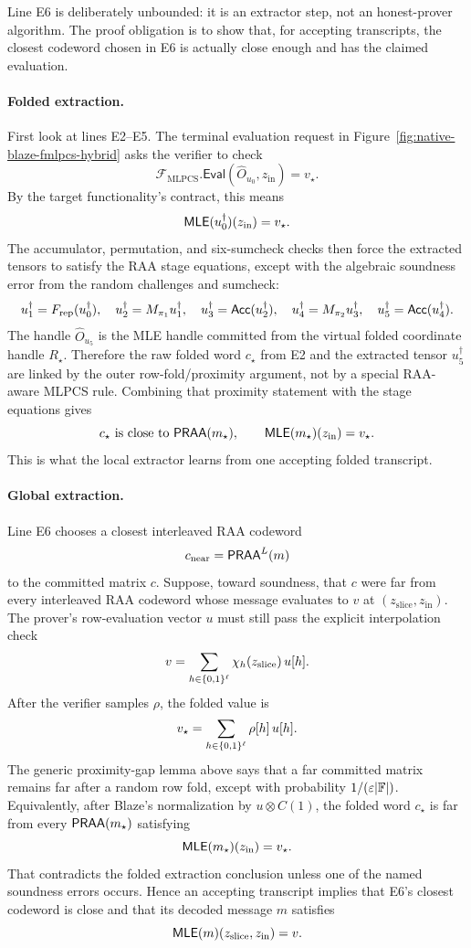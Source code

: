 Line E6 is deliberately unbounded: it is an extractor step, not an honest-prover
algorithm.  The proof obligation is to show that, for accepting transcripts,
the closest codeword chosen in E6 is actually close enough and has the claimed
evaluation.

\paragraph{Folded extraction.}
First look at lines E2--E5.  The terminal evaluation request in
Figure~\ref{fig:native-blaze-fmlpcs-hybrid} asks the verifier to check
\[
  \mathcal F_{\mathrm{MLPCS}}.\mathsf{Eval}
  (\widehat O_{u_0},z_{\mathrm{in}})
  =
  v_\star.
\]
By the target functionality's contract, this means
\[
  \mathsf{MLE}(u_0^\dagger)(z_{\mathrm{in}})=v_\star.
\]
The accumulator, permutation, and six-sumcheck checks then force the extracted
tensors to satisfy the RAA stage equations, except with the algebraic
soundness error from the random challenges and sumcheck:
\[
  u_1^\dagger=F_{\mathrm{rep}}(u_0^\dagger),\quad
  u_2^\dagger=M_{\pi_1}u_1^\dagger,\quad
  u_3^\dagger=\mathsf{Acc}(u_2^\dagger),\quad
  u_4^\dagger=M_{\pi_2}u_3^\dagger,\quad
  u_5^\dagger=\mathsf{Acc}(u_4^\dagger).
\]
The handle \(\widehat O_{u_5}\) is the MLE handle committed from the virtual
folded coordinate handle \(R_\star\).  Therefore the raw folded word
\(c_\star\) from E2 and the extracted tensor \(u_5^\dagger\) are linked by the
outer row-fold/proximity argument, not by a special RAA-aware MLPCS rule.
Combining that proximity statement with the stage equations gives
\[
  c_\star \text{ is close to } \mathsf{PRAA}(m_\star),
  \qquad
  \mathsf{MLE}(m_\star)(z_{\mathrm{in}})=v_\star.
\]
This is what the local extractor learns from one accepting folded transcript.

\paragraph{Global extraction.}
Line E6 chooses a closest interleaved RAA codeword
\[
  c_{\mathrm{near}}=\mathsf{PRAA}^L(m)
\]
to the committed matrix \(c\).  Suppose, toward soundness, that \(c\) were far
from every interleaved RAA codeword whose message evaluates to \(v\) at
\((z_{\mathrm{slice}},z_{\mathrm{in}})\).  The prover's row-evaluation vector
\(u\) must still pass the explicit interpolation check
\[
  v=
  \sum_{h\in\{0,1\}^\ell}\chi_h(z_{\mathrm{slice}})\,u[h].
\]
After the verifier samples \(\rho\), the folded value is
\[
  v_\star=\sum_{h\in\{0,1\}^\ell}\rho[h]\,u[h].
\]
The generic proximity-gap lemma above says that a far committed matrix remains
far after a random row fold, except with probability \(1/(\varepsilon|\mathbb{F}|)\).
Equivalently, after Blaze's normalization by \(u\otimes C(1)\), the folded word
\(c_\star\) is far from every \(\mathsf{PRAA}(m_\star)\) satisfying
\[
  \mathsf{MLE}(m_\star)(z_{\mathrm{in}})=v_\star.
\]
That contradicts the folded extraction conclusion unless one of the named
soundness errors occurs.  Hence an accepting transcript implies that E6's
closest codeword is close and that its decoded message \(m\) satisfies
\[
  \mathsf{MLE}(m)(z_{\mathrm{slice}},z_{\mathrm{in}})=v.
\]

